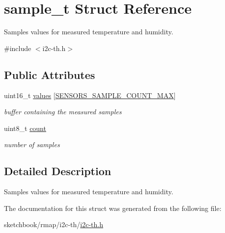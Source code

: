 \hypertarget{structsample__t}{}\section{sample\+\_\+t Struct Reference}
\label{structsample__t}


Samples values for measured temperature and humidity.  




{\ttfamily \#include $<$i2c-\/th.\+h$>$}

\subsection*{Public Attributes}
\begin{DoxyCompactItemize}
\item 
\mbox{\label{structsample__t_ab732cec6be98318b8f13563577f7d528}} 
uint16\+\_\+t \hyperlink{structsample__t_ab732cec6be98318b8f13563577f7d528}{values} \mbox{[}\hyperlink{i2c-th-config_8h_a5500c7c28f9fc2cab4deffbe07c98b39}{S\+E\+N\+S\+O\+R\+S\+\_\+\+S\+A\+M\+P\+L\+E\+\_\+\+C\+O\+U\+N\+T\+\_\+\+M\+AX}\mbox{]}
\begin{DoxyCompactList}\small\item\em buffer containing the measured samples \end{DoxyCompactList}\item 
\mbox{\label{structsample__t_a5a28abacf173c495a32a6f727e5d016e}} 
uint8\+\_\+t \hyperlink{structsample__t_a5a28abacf173c495a32a6f727e5d016e}{count}
\begin{DoxyCompactList}\small\item\em number of samples \end{DoxyCompactList}\end{DoxyCompactItemize}


\subsection{Detailed Description}
Samples values for measured temperature and humidity. 

The documentation for this struct was generated from the following file\+:\begin{DoxyCompactItemize}
\item 
sketchbook/rmap/i2c-\/th/\hyperlink{i2c-th_8h}{i2c-\/th.\+h}\end{DoxyCompactItemize}
